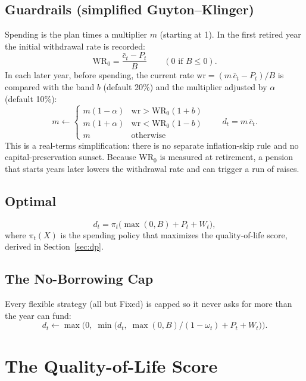 \documentclass[11pt,letterpaper]{article}
\begin{document}
\subsection{Guardrails (simplified Guyton--Klinger)}
Spending is the plan times a multiplier $m$ (starting at 1). In the first retired year the initial withdrawal rate is recorded:
\begin{equation}
\mathrm{WR}_0 = \frac{\bar c_t - P_t}{B} \qquad (0 \text{ if } B \le 0).
\end{equation}
In each later year, before spending, the current rate $\mathrm{wr} = (m\,\bar c_t - P_t)/B$ is compared with the band $b$ (default 20\%) and the multiplier adjusted by $\alpha$ (default 10\%):
\begin{equation}
m \leftarrow \begin{cases} m(1-\alpha) & \mathrm{wr} > \mathrm{WR}_0(1+b) \\ m(1+\alpha) & \mathrm{wr} < \mathrm{WR}_0(1-b) \\ m & \text{otherwise} \end{cases}
\qquad d_t = m\,\bar c_t .
\end{equation}
This is a real-terms simplification: there is no separate inflation-skip rule and no capital-preservation sunset. Because $\mathrm{WR}_0$ is measured at retirement, a pension that starts years later lowers the withdrawal rate and can trigger a run of raises.

\subsection{Optimal}
\begin{equation}
d_t = \pi_t\big(\max(0,B) + P_t + W_t\big),
\end{equation}
where $\pi_t(X)$ is the spending policy that maximizes the quality-of-life score, derived in Section~\ref{sec:dp}.

\subsection{The No-Borrowing Cap}
Every flexible strategy (all but Fixed) is capped so it never asks for more than the year can fund:
\begin{equation}
d_t \leftarrow \max\!\Big(0,\; \min\!\big(d_t,\; \max(0,B)/(1-\omega_t) + P_t + W_t\big)\Big).
\end{equation}

\section{The Quality-of-Life Score}
\label{sec:qol}
\end{document}
